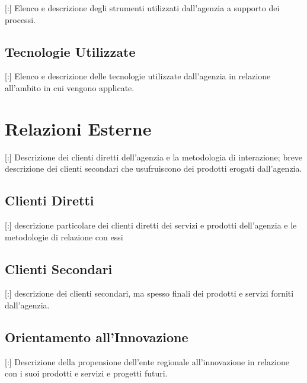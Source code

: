 [:] Elenco e descrizione degli strumenti utilizzati dall'agenzia a supporto dei processi.

\subsection{Tecnologie Utilizzate}

[:] Elenco e descrizione delle tecnologie utilizzate dall'agenzia in relazione all'ambito in cui vengono applicate.

\section{Relazioni Esterne}

[:] Descrizione dei clienti diretti dell'agenzia e la metodologia di interazione; breve descrizione dei clienti secondari che usufruiscono dei prodotti erogati dall'agenzia.

\subsection{Clienti Diretti}

[:]  descrizione particolare dei clienti diretti dei servizi e prodotti dell'agenzia e le metodologie di relazione con essi

\subsection{Clienti Secondari}

[:] descrizione dei clienti secondari, ma spesso finali dei prodotti e servizi forniti dall'agenzia.

\subsection{Orientamento all'Innovazione}

[:] Descrizione della propensione dell'ente regionale all'innovazione in relazione con i suoi prodotti e servizi e progetti futuri.


